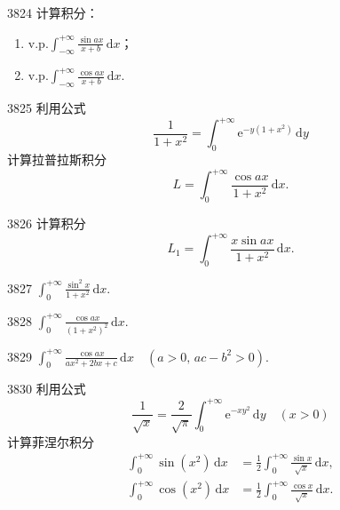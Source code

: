 \begin{prob}[M]{3824}
计算积分：
\begin{enumerate}[label=(\alph*), itemsep=2pt, topsep=3pt]
\item $\displaystyle \mathrm{v.p.} \int_{-\infty}^{+\infty} \frac{\sin ax}{x+b} \,\mathrm{d}x$；
\item $\displaystyle \mathrm{v.p.} \int_{-\infty}^{+\infty} \frac{\cos ax}{x+b} \,\mathrm{d}x$.
\end{enumerate}
\end{prob}

\begin{prob}[M]{3825}
利用公式
\[
\frac{1}{1+x^2} = \int_0^{+\infty} \mathrm{e}^{-y(1+x^2)} \,\mathrm{d}y
\]
计算拉普拉斯积分
\[
L = \int_0^{+\infty} \frac{\cos ax}{1+x^2} \,\mathrm{d}x.
\]
\end{prob}

\begin{prob}[S]{3826}
计算积分
\[
L_1 = \int_0^{+\infty} \frac{x\sin ax}{1+x^2} \,\mathrm{d}x.
\]
\end{prob}


\begin{prob}[S]{3827}
$\displaystyle \int_0^{+\infty} \frac{\sin^2 x}{1+x^2} \,\mathrm{d}x$.
\end{prob}

\begin{prob}[S]{3828}
$\displaystyle \int_0^{+\infty} \frac{\cos ax}{(1+x^2)^2} \,\mathrm{d}x$.
\end{prob}

\begin{prob}[S]{3829}
$\displaystyle \int_0^{+\infty} \frac{\cos ax}{ax^2+2bx+c} \,\mathrm{d}x \quad (a>0,\, ac-b^2>0)$.
\end{prob}

\begin{prob}[M]{3830}
利用公式
\[
\frac{1}{\sqrt{x}} = \frac{2}{\sqrt{\pi}} \int_0^{+\infty} \mathrm{e}^{-xy^2} \,\mathrm{d}y \quad (x>0)
\]
计算菲涅尔积分
\begin{align*}
\int_0^{+\infty} \sin(x^2) \,\mathrm{d}x &= \frac{1}{2} \int_0^{+\infty} \frac{\sin x}{\sqrt{x}} \,\mathrm{d}x, \\
\int_0^{+\infty} \cos(x^2) \,\mathrm{d}x &= \frac{1}{2} \int_0^{+\infty} \frac{\cos x}{\sqrt{x}} \,\mathrm{d}x.
\end{align*}
\end{prob}


